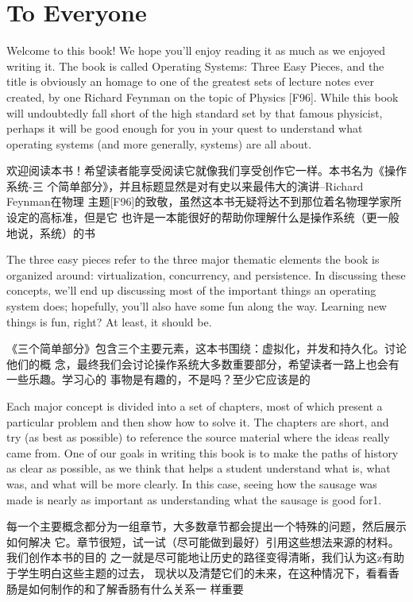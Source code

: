 
\section{To Everyone}
Welcome to this book! We hope you’ll enjoy reading it as much as we enjoyed
writing it. The book is called Operating Systems: Three Easy Pieces, and the
title is obviously an homage to one of the greatest sets of lecture notes ever
created, by one Richard Feynman on the topic of Physics [F96]. While this book
will undoubtedly fall short of the high standard set by that famous physicist,
perhaps it will be good enough for you in your quest to understand what
operating systems (and more generally, systems) are all about.

欢迎阅读本书！希望读者能享受阅读它就像我们享受创作它一样。本书名为《操作系统-三
个简单部分》，并且标题显然是对有史以来最伟大的演讲--Richard Feynman在物理
主题[F96]的致敬，虽然这本书无疑将达不到那位着名物理学家所设定的高标准，但是它
也许是一本能很好的帮助你理解什么是操作系统（更一般地说，系统）的书

The three easy pieces refer to the three major thematic elements the book is
organized around: virtualization, concurrency, and persistence. In discussing
these concepts, we’ll end up discussing most of the important things an operating
system does; hopefully, you’ll also have some fun along the way. Learning new
things is fun, right? At least, it should be.

《三个简单部分》包含三个主要元素，这本书围绕：虚拟化，并发和持久化。讨论他们的概
念，最终我们会讨论操作系统大多数重要部分，希望读者一路上也会有一些乐趣。学习心的
事物是有趣的，不是吗？至少它应该是的

Each major concept is divided into a set of chapters, most of which present a
particular problem and then show how to solve it. The chapters are short, and try
(as best as possible) to reference the source material where the ideas really came
from. One of our goals in writing this book is to make the paths of history as clear
as possible, as we think that helps a student understand what is, what was, and
what will be more clearly. In this case, seeing how the sausage was made is nearly
as important as understanding what the sausage is good for1.

每一个主要概念都分为一组章节，大多数章节都会提出一个特殊的问题，然后展示如何解决
它。章节很短，试一试（尽可能做到最好）引用这些想法来源的材料。我们创作本书的目的
之一就是尽可能地让历史的路径变得清晰，我们认为这z有助于学生明白这些主题的过去，
现状以及清楚它们的未来，在这种情况下，看看香肠是如何制作的和了解香肠有什么关系一
样重要